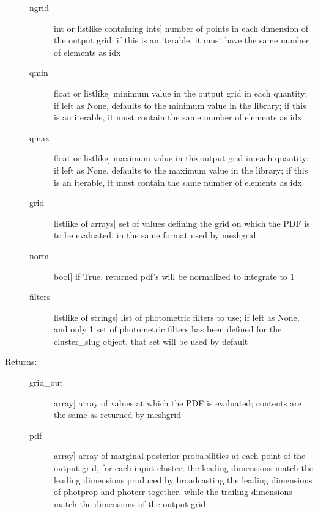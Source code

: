 \documentclass[letterpaper,10pt,english]{sphinxmanual}
\begin{document}
\begin{fulllineitems}
\begin{fulllineitems}
\begin{description}
\begin{description}
\item[{ngrid}] \leavevmode{[}int or listlike containing ints{]}
number of points in each dimension of the output grid;
if this is an iterable, it must have the same number of
elements as idx

\item[{qmin}] \leavevmode{[}float or listlike{]}
minimum value in the output grid in each quantity; if
left as None, defaults to the minimum value in the
library; if this is an iterable, it must contain the
same number of elements as idx

\item[{qmax}] \leavevmode{[}float or listlike{]}
maximum value in the output grid in each quantity; if
left as None, defaults to the maximum value in the
library; if this is an iterable, it must contain the
same number of elements as idx

\item[{grid}] \leavevmode{[}listlike of arrays{]}
set of values defining the grid on which the PDF is to
be evaluated, in the same format used by meshgrid

\item[{norm}] \leavevmode{[}bool{]}
if True, returned pdf's will be normalized to integrate
to 1

\item[{filters}] \leavevmode{[}listlike of strings{]}
list of photometric filters to use; if left as None, and
only 1 set of photometric filters has been defined for
the cluster\_slug object, that set will be used by
default

\end{description}

\item[{Returns:}] \leavevmode\begin{description}
\item[{grid\_out}] \leavevmode{[}array{]}
array of values at which the PDF is evaluated; contents
are the same as returned by meshgrid

\item[{pdf}] \leavevmode{[}array{]}
array of marginal posterior probabilities at each point
of the output grid, for each input cluster; the leading
dimensions match the leading dimensions produced by
broadcasting the leading dimensions of photprop and
photerr together, while the trailing dimensions match
the dimensions of the output grid

\end{description}

\end{description}

\end{fulllineitems}


\end{fulllineitems}
\end{document}
